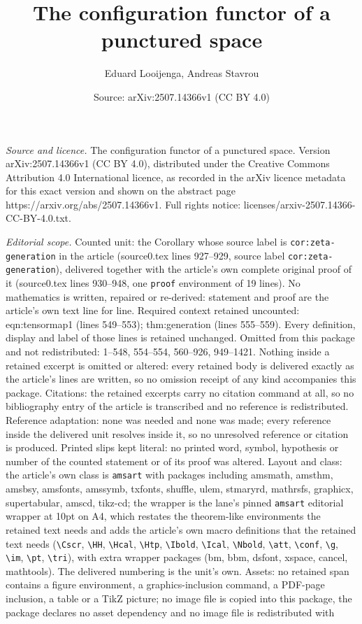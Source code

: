 \documentclass[10pt,a4paper]{amsart}
\title[The configuration functor of a punctured space]{The configuration functor of a punctured space}
\author{Eduard Looijenga, Andreas Stavrou}
\date{Source: arXiv:2507.14366v1 (CC BY 4.0)}
\begin{document}
\maketitle

\noindent\emph{Source and licence.} The configuration functor of a punctured space. Version arXiv:2507.14366v1 (CC BY 4.0), distributed under the Creative Commons Attribution 4.0 International licence, as recorded in the arXiv licence metadata for this exact version and shown on the abstract page https://arxiv.org/abs/2507.14366v1. Full rights notice: licenses/arxiv-2507.14366-CC-BY-4.0.txt.\par\smallskip

\noindent\textit{Editorial scope.} Counted unit: the Corollary whose source label is \texttt{cor:zeta-generation} in the article (source0.tex lines 927--929, source label \texttt{cor:zeta-generation}), delivered together with the article's own complete original proof of it (source0.tex lines 930--948, one \texttt{proof} environment of 19 lines). No mathematics is written, repaired or re-derived: statement and proof are the article's own text line for line. Required context retained uncounted: eqn:tensormap1 (lines 549--553); thm:generation (lines 555--559). Every definition, display and label of those lines is retained unchanged. Omitted from this package and not redistributed: 1--548, 554--554, 560--926, 949--1421. Nothing inside a retained excerpt is omitted or altered: every retained body is delivered exactly as the article's lines are written, so no omission receipt of any kind accompanies this package. Citations: the retained excerpts carry no citation command at all, so no bibliography entry of the article is transcribed and no reference is redistributed. Reference adaptation: none was needed and none was made; every reference inside the delivered unit resolves inside it, so no unresolved reference or citation is produced. Printed slips kept literal: no printed word, symbol, hypothesis or number of the counted statement or of its proof was altered. Layout and class: the article's own class is \texttt{amsart} with packages including amsmath, amsthm, amsbsy, amsfonts, amssymb, txfonts, shuffle, ulem, stmaryrd, mathrsfs, graphicx, supertabular, amscd, tikz-cd; the wrapper is the lane's pinned \texttt{amsart} editorial wrapper at 10pt on A4, which restates the theorem-like environments the retained text needs and adds the article's own macro definitions that the retained text needs (\texttt{\textbackslash Cscr}, \texttt{\textbackslash HH}, \texttt{\textbackslash Hcal}, \texttt{\textbackslash Htp}, \texttt{\textbackslash Ibold}, \texttt{\textbackslash Ical}, \texttt{\textbackslash Nbold}, \texttt{\textbackslash att}, \texttt{\textbackslash conf}, \texttt{\textbackslash g}, \texttt{\textbackslash im}, \texttt{\textbackslash pt}, \texttt{\textbackslash tri}), with extra wrapper packages (bm, bbm, dsfont, xspace, cancel, mathtools). The delivered numbering is the unit's own. Assets: no retained span contains a figure environment, a graphics-inclusion command, a PDF-page inclusion, a table or a TikZ picture; no image file is copied into this package, the package declares no asset dependency and no image file is redistributed with 
\end{document}
